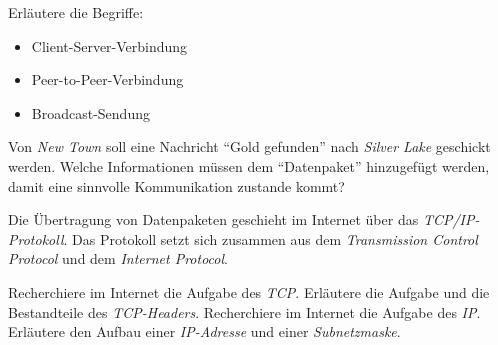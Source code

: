 \documentclass[10pt, a4paper]{scrartcl}
\begin{document}
\begin{aufgabe}
Erläutere die Begriffe:
\begin{itemize}
	\item Client-Server-Verbindung
	\item Peer-to-Peer-Verbindung
	\item Broadcast-Sendung
\end{itemize}
\end{aufgabe}

\begin{aufgabe}
Von \emph{New Town} soll eine Nachricht \enquote{Gold gefunden} nach \emph{Silver Lake} geschickt werden. Welche Informationen müssen dem \enquote{Datenpaket} hinzugefügt werden, damit eine sinnvolle Kommunikation zustande kommt?
\end{aufgabe}

\begin{aufgabe}
Die Übertragung von Datenpaketen geschieht im Internet über das \emph{TCP/IP-Protokoll}. Das Protokoll setzt sich zusammen aus dem \emph{Transmission Control Protocol} und dem \emph{Internet Protocol}.
	\begin{teilaufgaben}
		\teilaufgabe Recherchiere im Internet die Aufgabe des \emph{TCP}.
		\teilaufgabe Erläutere die Aufgabe und die Bestandteile des \emph{TCP-Headers}.
		\teilaufgabe Recherchiere im Internet die Aufgabe des \emph{IP}.
		\teilaufgabe Erläutere den Aufbau einer \emph{IP-Adresse} und einer \emph{Subnetzmaske}.
	\end{teilaufgaben}
\end{aufgabe}
\end{document}
